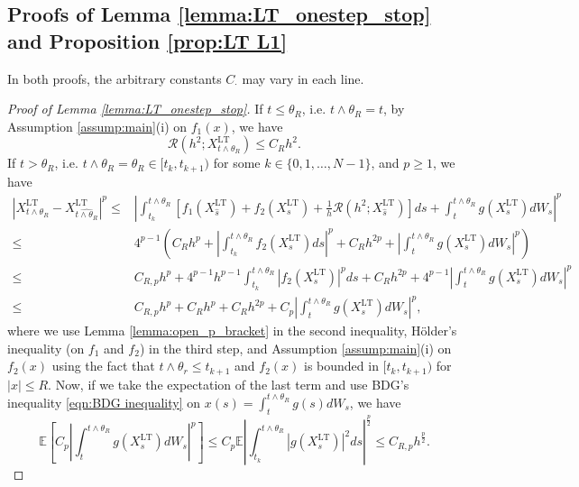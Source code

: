 \documentclass[a4paper,12pt]{article}
\numberwithin{equation}{section}
\theoremstyle{plain}
\theoremstyle{definition}
\begin{document}
\begin{appendix}
\subsection{Proofs of Lemma \ref{lemma:LT_onestep_stop} and Proposition \ref{prop:LT L1}}
In both proofs, the arbitrary constants $C_{\cdot}$ may vary in each line.
\begin{proof}[Proof of Lemma \ref{lemma:LT_onestep_stop}]
If $t\leq \theta_R$, i.e. $t\wedge\theta_R=t$,  by Assumption \ref{assump:main}(i) on $f_1(x)$, we have
    \begin{equation*}
        \mathcal{R}(h^2;X^{\textrm{LT}}_{t\wedge \theta_R})\leq C_Rh^2.
    \end{equation*}
If $t>\theta_R$, i.e. $t\wedge \theta_R=\theta_R\in [t_k,t_{k+1})$ for some $k\in \{0,1,\dots,N-1\}$, and $p\geq1$, we have
    \begin{align*}
         \left|X^{\textrm{LT}}_{t \wedge \theta_R}-X^{\textrm{LT}}_{\widehat{t \wedge \theta_R}}\right|^p \leq &\left|\int_{t_k}^{t\wedge \theta_R} \left[f_1(X^{\textrm{LT}}_{\hat{s}})+f_2(X^{\textrm{LT}}_s)+\frac{1}{h}\mathcal{R}(h^2;X^{\textrm{LT}}_{\hat{s}})\right]ds+\int_{t}^{t\wedge \theta_R}g(X^{\textrm{LT}}_s)dW_s\right|^p\\
         \leq& 4^{p-1}\left(C_R h^p+\left|\int_{t_k}^{t\wedge \theta_R}f_2(X^{\textrm{LT}}_s)ds\right|^p+C_Rh^{2p}+\left|\int_{t}^{t\wedge \theta_R}g(X^{\textrm{LT}}_s)dW_s\right|^p\right)\\
         \leq&C_{R,p}h^p+4^{p-1}h^{p-1}\int_{t_k}^{t\wedge \theta_R}\left|f_2(X^{\textrm{LT}}_s)\right|^pds+C_Rh^{2p}+4^{p-1}\left|\int_{t}^{t\wedge \theta_R}g(X^{\textrm{LT}}_s)dW_s\right|^p\\
         \leq&C_{R,p}h^p+C_Rh^p+C_Rh^{2p}+C_p\left|\int_{t}^{t\wedge \theta_R}g(X^{\textrm{LT}}_s)dW_s\right|^p,
    \end{align*}
    where we use Lemma \ref{lemma:open_p_bracket} in the second inequality, H\"older's inequality (on $f_1$ and $f_2$) in the third step, and Assumption \ref{assump:main}(i) on $f_2(x)$ using the fact that $t\wedge\theta_r\leq t_{k+1}$ and $f_2(x)$ is bounded in $[t_k,t_{k+1})$ for $|x|\leq R$. Now, if we take the expectation of the last term and use BDG's inequality \eqref{eqn:BDG inequality} on $x(s)=\int_t^{t\wedge\theta_R}g(s)dW_s$, we have 
    \begin{equation*}
        \mathbb{E}\left[C_p\left|\int_{t}^{t\wedge \theta_R}g(X^{\textrm{LT}}_s)dW_s\right|^p\right]\leq C_p\mathbb{E}\left|\int_{t_k}^{t\wedge \theta_R}|g(X^{\textrm{LT}}_s)|^{ 2}ds\right|^{\frac{p}{2}}\leq C_{R,p}h^{\frac{p}{2}}.

\end{equation*}
\end{proof}
\end{appendix}
\end{document}
